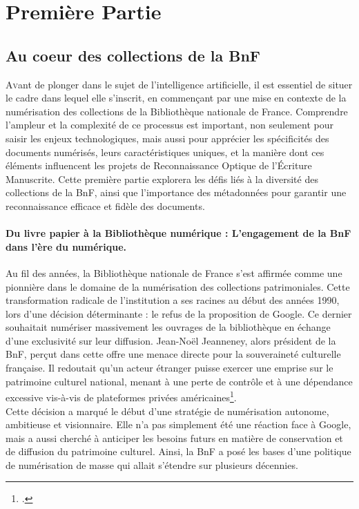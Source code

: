 \documentclass[a4paper,12pt,twoside]{book}
\begin{document}
	

	\part{Première Partie}
\chapter{Au coeur des collections de la BnF}

\lettrine{A}vant de plonger dans le sujet de l’intelligence artificielle, il est
essentiel de situer le cadre dans lequel elle s’inscrit, en commençant
par une mise en contexte de la numérisation des collections de la
Bibliothèque nationale de France. Comprendre l’ampleur et la complexité de
ce processus est important, non seulement pour saisir les enjeux
technologiques, mais aussi pour apprécier les spécificités des documents
numérisés, leurs caractéristiques uniques, et la manière dont ces éléments
influencent les projets de Reconnaissance Optique de l’Écriture Manuscrite.
Cette première partie explorera les défis liés à la diversité des collections de la
BnF, ainsi que l’importance des métadonnées pour garantir une reconnaissance
efficace et fidèle des documents.

\subsection{Du livre papier à la Bibliothèque numérique : L’engagement de la BnF dans
	l’ère du numérique.}
	
	Au fil des années, la Bibliothèque nationale de France s’est affirmée
	comme une pionnière dans le domaine de la numérisation des collections
	patrimoniales. Cette transformation radicale de l’institution a ses racines au
	début des années 1990, lors d’une décision déterminante : le refus de la
	proposition de Google. Ce dernier souhaitait numériser massivement les
	ouvrages de la bibliothèque en échange d’une exclusivité sur leur diffusion.
	Jean-Noël Jeanneney, alors président de la BnF, perçut dans cette offre une
	menace directe pour la souveraineté culturelle française. Il redoutait qu’un
	acteur étranger puisse exercer une emprise sur le patrimoine culturel national,
	menant à une perte de contrôle et à une dépendance excessive vis-à-vis de
	plateformes privées américaines\footcite{bruckmann_numerisation_2012}.
	\\
	
	Cette décision a marqué le début d’une stratégie de numérisation
	autonome, ambitieuse et visionnaire. Elle n’a pas simplement été une réaction
	face à Google, mais a aussi cherché à anticiper les besoins futurs en matière de
	conservation et de diffusion du patrimoine culturel. Ainsi, la BnF a posé les
	bases d’une politique de numérisation de masse qui allait s’étendre sur
	plusieurs décennies.
	
\end{document}
